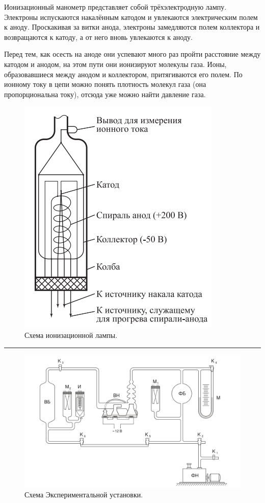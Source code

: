 \documentclass[a4paper,12pt]{report}
\begin{document}
    \begin{multicols}{2}
        Ионизационный манометр представляет собой трёхэлектродную лампу. Электроны испускаются накалённым катодом и увлекаются электрическим полем к аноду. Проскакивая за витки анода, электроны замедляются полем коллектора и возвращаются к катоду, а от него вновь увлекаются к аноду.

        Перед тем, как осесть на аноде они успевают много раз пройти расстояние между катодом и анодом, на этом пути они ионизируют молекулы газа. Ионы, образовавшиеся между анодом и коллектором, притягиваются его полем. По ионному току в цепи можно понять плотность молекул газа (она пропорциональна току), отсюда уже можно найти давление газа. 

        \begin{figure}[H]
            \centering
            \includegraphics[width=0.7\columnwidth]{../img/ion_lamp.png}
            \caption{Схема ионизационной лампы.}
        \end{figure}
    \end{multicols}

    \hrule

    \begin{figure}[H]
        \centering
        \includegraphics[width=0.5\linewidth]{../img/ustanovka.png}
        \caption{Схема Экспериментальной установки.}
    \end{figure}
\end{document}
